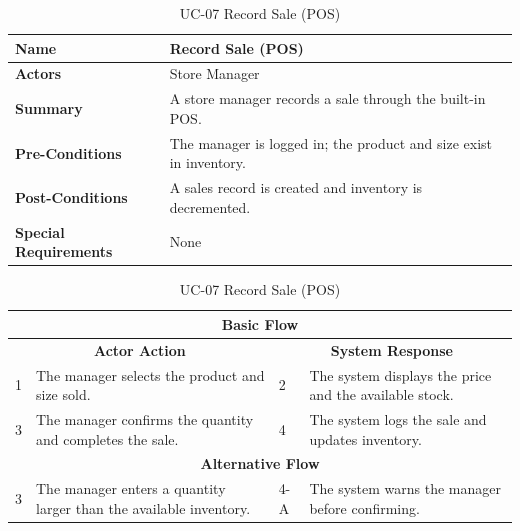 \documentclass{StockSense}
\begin{document}
\begin{table}[!htbp]
\centering
\caption{UC-07 Record Sale (POS)}
{\small\linespread{1}\selectfont
\begin{tabular}{|p{}|p{}|}
\hline
\textbf{Name} & Record Sale (POS) \\ \hline
\textbf{Actors} & Store Manager \\ \hline
\textbf{Summary} & A store manager records a sale through the built-in POS. \\ \hline
\textbf{Pre-Conditions} & The manager is logged in; the product and size exist in inventory. \\ \hline
\textbf{Post-Conditions} & A sales record is created and inventory is decremented. \\ \hline
\textbf{Special Requirements} & None \\ \hline
\end{tabular}\par\nointerlineskip
\begin{tabular}{|p{}|p{}|p{}|p{}|}
\multicolumn{4}{|c|}{\textbf{Basic Flow}} \\ \hline
\multicolumn{2}{|c|}{\textbf{Actor Action}} & \multicolumn{2}{c|}{\textbf{System Response}} \\ \hline
1 & The manager selects the product and size sold. & 2 & The system displays the price and the available stock. \\ \hline
3 & The manager confirms the quantity and completes the sale. & 4 & The system logs the sale and updates inventory. \\ \hline
\multicolumn{4}{|c|}{\textbf{Alternative Flow}} \\ \hline
3 & The manager enters a quantity larger than the available inventory. & 4-A & The system warns the manager before confirming. \\ \hline
\end{tabular}\par}
\end{table}
\end{document}
